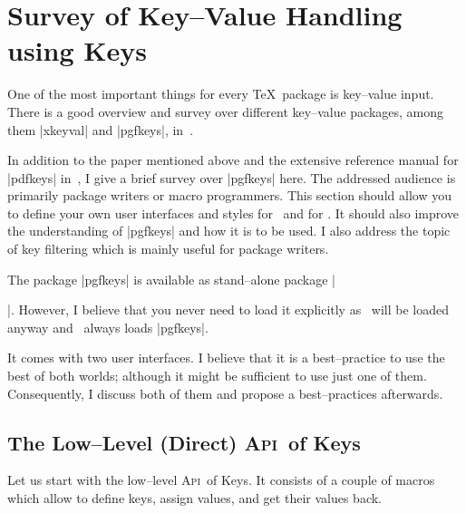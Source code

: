 \documentclass[a4paper,doc2]{ltxdoc}
\def\API{\textsc{Api}}%
\begin{document}
\section{Survey of Key--Value Handling using \PGF Keys}

One of the most important things for every \TeX\ package is key--value input. There is a good overview and survey over different key--value packages, among them |xkeyval| and |pgfkeys|, in~\cite{keyvalintro}.

In addition to the paper mentioned above and the extensive reference manual for |pdfkeys| in~\cite{tikz}, I give a brief survey over |pgfkeys| here. The addressed audience is primarily package writers or macro programmers. This section should allow you to define your own user interfaces and styles for \PGFPlots\ and for \PGF. It should also improve the understanding of |pgfkeys| and how it is to be used. I also address the topic of key filtering which is mainly useful for package writers.

The package |pgfkeys| is available as stand--alone package |\usepackage{pgfkeys}|. However, I believe that you never need to load it explicitly as \PGF\ will be loaded anyway and \PGF\ always loads |pgfkeys|.

It comes with two user interfaces. I believe that it is a best--practice to use the best of both worlds; although it might be sufficient to use just one of them. Consequently, I discuss both of them and propose a best--practices afterwards.

\subsection{The Low--Level (Direct) \API\ of \PGF Keys}
Let us start with the low--level \API\ of \PGF Keys. It consists of a couple of macros which allow to define keys, assign values, and get their values back.
\end{document}
